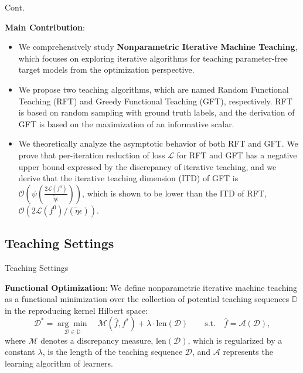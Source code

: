 \documentclass[aspectratio=169,xcolor=dvipsnames]{beamer}
\begin{document}
\begin{frame}{Cont.}

{\bf \color{blue} Main Contribution}: 
\begin{itemize}
\item We comprehensively study {\bf Nonparametric Iterative Machine Teaching}, which focuses on exploring iterative algorithms for teaching \alert{parameter-free target models} from the \alert{optimization} perspective.
\item We propose two teaching algorithms, which are named \alert{Random Functional Teaching} (RFT) and \alert{Greedy Functional Teaching} (GFT), respectively. RFT is based on random sampling with ground truth labels, and the derivation of GFT is based on the maximization of an informative scalar.
\item We theoretically analyze the \alert{asymptotic behavior} of both RFT and GFT. We prove that per-iteration reduction of loss $\mathcal{L}$ for RFT and GFT has a \alert{negative upper bound} expressed by the discrepancy of iterative teaching, and we derive that the iterative teaching dimension (ITD) of GFT is $\mathcal{O}(\psi(\frac{2\mathcal{L}(f^0)}{\tilde{\eta}\epsilon}))$, which is shown to be lower than the ITD of RFT, $\mathcal{O}(2\mathcal{L}(f^0)/\left(\tilde{\eta}\epsilon\right))$.
\end{itemize}
\end{frame}
\subsection{Teaching Settings}
\begin{frame}{Teaching Settings}

{\bf \color{blue} Functional Optimization}: We define nonparametric iterative machine teaching as a \alert{functional minimization} over the collection of potential teaching sequences $\mathbb{D}$ in the reproducing kernel Hilbert space:
\begin{equation}\label{eq1}
 \mathcal{D}^*=\underset{\mathcal{D}\in\mathbb{D}}{\arg\min}\quad \mathcal{M}(\hat{f},f^*)+\lambda\cdot \text{len}(\mathcal{D}) \qquad\text{s.t.}\quad\hat{f}=\mathcal{A}(\mathcal{D}),
\end{equation}
where $\mathcal{M}$ denotes a discrepancy measure, $\text{len}(\mathcal{D})$, 
which is regularized by a constant $\lambda$, is the length of the teaching sequence $\mathcal{D}$, and $\mathcal{A}$ represents the learning algorithm of learners. 
\end{frame}
\end{document}
